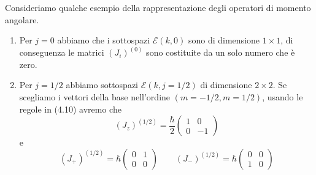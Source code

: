 Consideriamo qualche esempio della rappresentazione degli operatori di momento angolare.

\begin{enumerate}
	\item Per $j = 0$ abbiamo che i sottospazi $\mathcal{E}(k,0)$ sono di dimensione $1 \times 1$, di conseguenza le matrici $(J_i)^{(0)}$ sono costituite da un solo numero che \`e zero.
	\item Per $j = 1/2$ abbiamo sottospazi $\mathcal{E}(k,j = 1/2)$ di dimensione $2 \times 2$. Se scegliamo i vettori della base nell'ordine $(m=-1/2,m=1/2)$, usando le regole in (4.10) avremo che 
	\begin{equation*}
		\left(J_z\right)^{(1 / 2)}=\frac{\hbar}{2}\left(\begin{array}{cc}
1 & 0 \\
0 & -1
\end{array}\right)
	\end{equation*} 
	e
	\begin{equation*}
		\left(J_{+}\right)^{(1 / 2)}=\hbar\left(\begin{array}{ll}
0 & 1 \\
0 & 0
\end{array}\right) \quad \quad \left(J_{-}\right)^{(1 / 2)}=\hbar\left(\begin{array}{ll}
0 & 0 \\
1 & 0
\end{array}\right)
	\end{equation*}
	

\end{enumerate}
